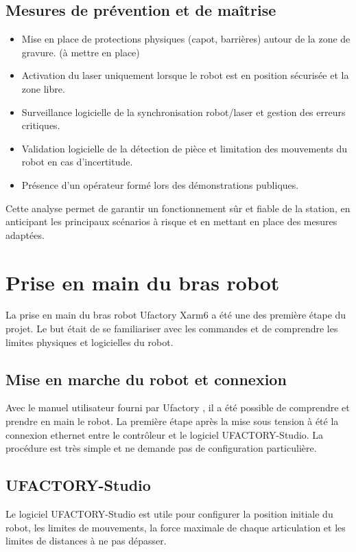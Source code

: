 \subsection{Mesures de prévention et de maîtrise}
\begin{itemize}
    \item Mise en place de protections physiques (capot, barrières) autour de la zone de gravure. (à mettre en place)
    \item Activation du laser uniquement lorsque le robot est en position sécurisée et la zone libre.
    \item Surveillance logicielle de la synchronisation robot/laser et gestion des erreurs critiques.
    \item Validation logicielle de la détection de pièce et limitation des mouvements du robot en cas d'incertitude.
    \item Présence d'un opérateur formé lors des démonstrations publiques.
\end{itemize}

Cette analyse permet de garantir un fonctionnement sûr et fiable de la station, en anticipant les principaux scénarios à risque et en mettant en place des mesures adaptées.

\section{Prise en main du bras robot}
La prise en main du bras robot Ufactory Xarm6 a été une des première étape du projet. Le but était de se familiariser avec les commandes et de comprendre les limites physiques et logicielles du robot.

\subsection{Mise en marche du robot et connexion}
Avec le manuel utilisateur fourni par Ufactory \cite{UserManual}, il a été possible de comprendre et prendre en main le robot. La première étape après la mise sous tension à été la connexion ethernet entre le contrôleur et le logiciel UFACTORY-Studio. La procédure est très simple et ne demande pas de configuration particulière.

\subsection{UFACTORY-Studio}
Le logiciel UFACTORY-Studio est utile pour configurer la position initiale du robot, les limites de mouvements, la force maximale de chaque articulation et les limites de distances à ne pas dépasser.

